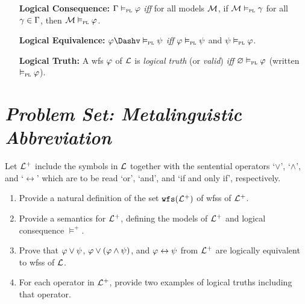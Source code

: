 \documentclass[a4paper, 11pt]{article} %
\begin{document}
\begin{enumerate}[leftmargin=1.2in]
	\item[\bf Logical Consequence:] $\Gamma \vDash_{\textsc{pl}} \varphi$ \textit{iff} for all models $\mathcal{M}$, if $\mathcal{M}\vDash_{\textsc{pl}} \gamma$ for all $\gamma\in\Gamma$, then $\mathcal{M}\vDash_{\textsc{pl}} \varphi$.
	\item[\bf Logical Equivalence:] $\metaA \Dashv\PLmodels \metaB$ \textit{iff} $\varphi\vDash_{\textsc{pl}} \psi$ and $\psi\vDash_{\textsc{pl}} \varphi$.
	\item[\bf Logical Truth:] A wfs $\varphi$ of $\mathcal{L}$ is \textit{logical truth} (or \textit{valid}) \textit{iff} $\varnothing\vDash_{\textsc{pl}} \varphi$ (written $\vDash_{\textsc{pl}} \varphi$).
\end{enumerate}




\section*{\it Problem Set: Metalinguistic Abbreviation}

Let $\mathcal{L}^+$ include the symbols in $\mathcal{L}$ together with the sentential operators `$\vee$', `$\wedge$', and `$\leftrightarrow$' which are to be read `or', `and', and `if and only if', respectively.
\begin{enumerate}[itemsep=2pt]\small
	\item Provide a natural definition of the set $\texttt{wfs}(\mathcal{L}^+)$ of wfss of $\mathcal{L}^+$.
	\item Provide a semantics for $\mathcal{L}^+$, defining the models of $\mathcal{L}^+$ and logical consequence $\vDash^+$.
	\item Prove that $\varphi \vee \psi$, $\varphi \vee (\varphi \wedge \psi)$, and $\varphi\leftrightarrow \psi$ from $\mathcal{L}^+$ are logically equivalent to wfss of $\mathcal{L}$.
	\item For each operator in $\mathcal{L}^+$, provide two examples of logical truths including that operator.
\end{enumerate}
\end{document}
